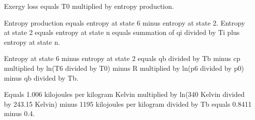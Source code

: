 Exergy loss equals T0 multiplied by entropy production.  

Entropy production equals entropy at state 6 minus entropy at state 2.  
Entropy at state 2 equals entropy at state n equals summation of qi divided by Ti plus entropy at state n.  

Entropy at state 6 minus entropy at state 2 equals qb divided by Tb minus cp multiplied by ln(T6 divided by T0) minus R multiplied by ln(p6 divided by p0) minus qb divided by Tb.  

Equals 1.006 kilojoules per kilogram Kelvin multiplied by ln(340 Kelvin divided by 243.15 Kelvin) minus 1195 kilojoules per kilogram divided by Tb equals 0.8411 minus 0.4.